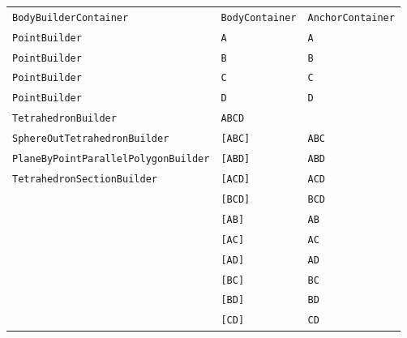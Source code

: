 \documentclass[fontsize=10px, a4paper, openany]{scrbook}
\begin{document}
\begin{enumerate}
\begin{table}[h!]
\centering
\begin{tabular}{lll}
\texttt{BodyBuilderContainer}                 & \texttt{BodyContainer} & \texttt{AnchorContainer} \\
\texttt{PointBuilder} & \texttt{A}    & \texttt{A}      \\
\texttt{PointBuilder} & \texttt{B}    & \texttt{B}      \\
\texttt{PointBuilder} & \texttt{C}    & \texttt{C}      \\
\texttt{PointBuilder} & \texttt{D}    & \texttt{D}      \\
\cellcolor[HTML]{68CBD0}\texttt{TetrahedronBuilder} & \cellcolor[HTML]{68CBD0}\texttt{ABCD} & \\
\texttt{SphereOutTetrahedronBuilder}          & \cellcolor[HTML]{68CBD0}\texttt{[ABC]} & \cellcolor[HTML]{68CBD0}\texttt{ABC} \\
\texttt{PlaneByPointParallelPolygonBuilder}   & \cellcolor[HTML]{68CBD0}\texttt{[ABD]} & \cellcolor[HTML]{68CBD0}\texttt{ABD} \\
\texttt{TetrahedronSectionBuilder}            & \cellcolor[HTML]{68CBD0}\texttt{[ACD]} & \cellcolor[HTML]{68CBD0}\texttt{ACD} \\
 & \cellcolor[HTML]{68CBD0}\texttt{[BCD]} & \cellcolor[HTML]{68CBD0}\texttt{BCD} \\
 & \cellcolor[HTML]{68CBD0}\texttt{[AB]} & \cellcolor[HTML]{68CBD0}\texttt{AB} \\
 & \cellcolor[HTML]{68CBD0}\texttt{[AC]} & \cellcolor[HTML]{68CBD0}\texttt{AC} \\
 & \cellcolor[HTML]{68CBD0}\texttt{[AD]} & \cellcolor[HTML]{68CBD0}\texttt{AD} \\
 & \cellcolor[HTML]{68CBD0}\texttt{[BC]} & \cellcolor[HTML]{68CBD0}\texttt{BC} \\
 & \cellcolor[HTML]{68CBD0}\texttt{[BD]} & \cellcolor[HTML]{68CBD0}\texttt{BD} \\
 & \cellcolor[HTML]{68CBD0}\texttt{[CD]} & \cellcolor[HTML]{68CBD0}\texttt{CD}
\end{tabular}
\end{table}

\begin{center}
\end{center}


\end{enumerate}
\end{document}
